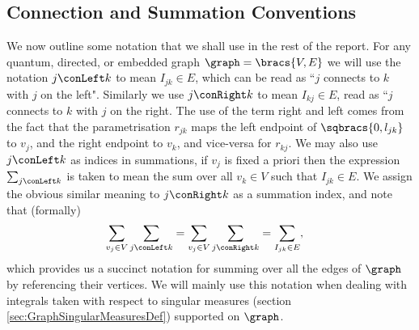 \subsection{Connection and Summation Conventions} \label{sec:GraphSimDefinitions}
We now outline some notation that we shall use in the rest of the report.
For any quantum, directed, or embedded graph $\graph=\bracs{V,E}$ we will use the notation $j\conLeft k$ to mean $I_{jk}\in E$, which can be read as ``$j$ connects to $k$ with $j$ on the left".
Similarly we use $j\conRight k$ to mean $I_{kj}\in E$, read as ``$j$ connects to $k$ with $j$ on the right.
The use of the term right and left comes from the fact that the parametrisation $r_{jk}$ maps the left endpoint of $\sqbracs{0,l_{jk}}$ to $v_j$, and the right endpoint to $v_k$, and vice-versa for $r_{kj}$.
We may also use $j\conLeft k$ as indices in summations, if $v_j$ is fixed a priori then the expression $\sum_{j\conLeft k}$ is taken to mean the sum over all $v_k\in V$ such that $I_{jk}\in E$.
We assign the obvious similar meaning to $j\conRight k$ as a summation index, and note that (formally)
\begin{align*}
	\sum_{v_j\in V}\sum_{j\conLeft k} &= \sum_{v_j\in V}\sum_{j\conRight k} = \sum_{I_{jk}\in E},
\end{align*}
which provides us a succinct notation for summing over all the edges of $\graph$ by referencing their vertices.
We will mainly use this notation when dealing with integrals taken with respect to singular measures (section \ref{sec:GraphSingularMeasuresDef}) supported on $\graph$.

